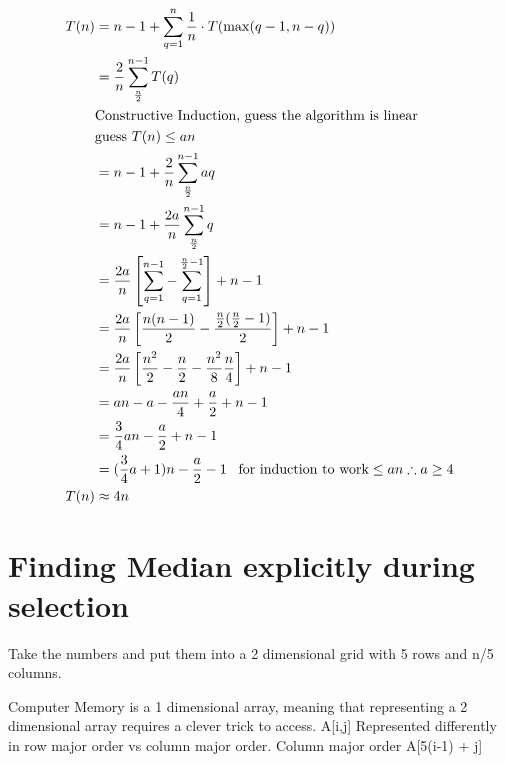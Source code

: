 \documentclass[english, 10pt]{article}
\begin{document}
\begin{align*}
    T(n) &= n-1 + \sum_{q=1}^{n}\frac{1}{n}\cdot T(\max(q-1,n-q)) \\
    &= \frac{2}{n}\sum_{\frac{n}{2}}^{n-1}T(q) \\
    &\text{Constructive Induction, guess the algorithm is linear} \\
    &\text{guess } T(n) \le an \\
    &= n-1 + \frac{2}{n}\sum_{\frac{n}{2}}^{n-1}aq \\
    &= n-1 + \frac{2a}{n}\sum_{\frac{n}{2}}^{n-1}q \\
    &= \frac{2a}{n}\left[ \sum_{q=1}^{n-1} - \sum_{q=1}^{\frac{n}{2}-1} \right] + n-1 \\
    &= \frac{2a}{n}\left[ \frac{n(n-1)}{2}-\frac{\frac{n}{2}(\frac{n}{2}-1)}{2} \right] + n -1 \\
    &= \frac{2a}{n}\left[ \frac{n^2}{2}-\frac{n}{2}-\frac{n^2}{8}\frac{n}{4}\right] + n -1 \\
    &= an -a -\frac{an}{4}+\frac{a}{2} +n -1 \\
    &= \frac{3}{4}an - \frac{a}{2} + n -1 \\
    &= (\frac{3}{4}a + 1)n - \frac{a}{2}-1  \;\;\;\text{for induction to work} \le an \therefore a \ge 4 \\
    T(n) &\approx 4n \\
\end{align*}


\section{Finding Median explicitly during selection}

Take the numbers and put them into a 2 dimensional grid with 5 rows and n/5 columns.

Computer Memory is a 1 dimensional array, meaning that representing a 2
dimensional array requires a clever trick to access.  A[i,j] Represented
differently in row major order vs column major order.  Column major order
A[5(i-1) + j]%
\end{document}
